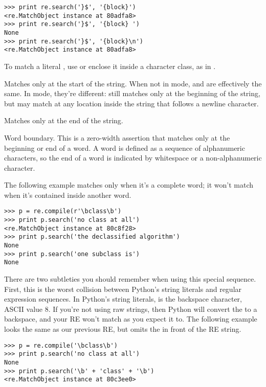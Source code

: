 \documentclass{howto}
\begin{document}
\begin{list}{}{}
\begin{verbatim}
>>> print re.search('}$', '{block}')
<re.MatchObject instance at 80adfa8>
>>> print re.search('}$', '{block} ')
None
>>> print re.search('}$', '{block}\n')
<re.MatchObject instance at 80adfa8>
\end{verbatim}

To match a literal \character{\$}, use \regexp{\e\$} or enclose it
inside a character class, as in  \regexp{[\$]}.

\item[\regexp{\e A}] Matches only at the start of the string.  When
not in  mode,  and \regexp{\^} are
effectively the same.  In  mode, they're
different:  still matches only at the beginning of the
string, but \regexp{\^} may match at any location inside the string
that follows a newline character.

\item[\regexp{\e Z}] Matches only at the end of the string.  

\item[\regexp{\e b}] Word boundary.  
This is a zero-width assertion that matches only at the
beginning or end of a word.  A word is defined as a sequence of
alphanumeric characters, so the end of a word is indicated by
whitespace or a non-alphanumeric character.  

The following example matches  only when it's a complete
word; it won't match when it's contained inside another word.

\begin{verbatim}
>>> p = re.compile(r'\bclass\b')
>>> print p.search('no class at all')
<re.MatchObject instance at 80c8f28>
>>> print p.search('the declassified algorithm')
None
>>> print p.search('one subclass is')
None
\end{verbatim}

There are two subtleties you should remember when using this special
sequence.  First, this is the worst collision between Python's string
literals and regular expression sequences.  In Python's string
literals,  is the backspace character, ASCII value 8.  If
you're not using raw strings, then Python will convert the  to
a backspace, and your RE won't match as you expect it to.  The
following example looks the same as our previous RE, but omits
the  in front of the RE string.

\begin{verbatim}
>>> p = re.compile('\bclass\b')
>>> print p.search('no class at all')
None
>>> print p.search('\b' + 'class' + '\b')  
<re.MatchObject instance at 80c3ee0>
\end{verbatim}


\end{list}
\end{document}
